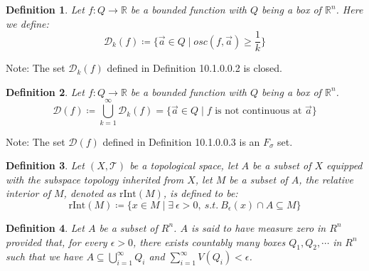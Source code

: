 \documentclass[15pt]{book}
\theoremstyle{break}
\theoremstyle{break}
\newtheorem{defn}{Definition}[corL]
\newcommand{\R}{\mathbb{R}}
\newcommand{\D}{\mathcal{D}}
\newcommand{\T}{\mathcal{T}}
\newcommand{\note}{\color{red}Note: \color{black}}
\begin{document}
\hfill\break
\begin{defn}
Let $f:Q \to \R$ be a bounded function with $Q$ being a box of $\R^n$. Here we define:
$$\D_k(f)\coloneqq \{ \vec{a} \in Q \mid osc(f,\vec{a}) \geq \frac{1}{k}\}$$
\end{defn}
 
\note The set $\D_k(f)$ defined in Definition 10.1.0.0.2 is closed.

\begin{defn}
Let $f:Q \to \R$ be a bounded function with $Q$ being a box of $\R^n$. $$\D(f) \coloneqq \bigcup_{k=1}^\infty \D_k(f) = \{\vec{a}\in Q \mid f \text{ is not continuous at } \vec{a}\}$$
\end{defn}
\note The set $\D(f)$ defined in Definition 10.1.0.0.3 is an $F_\sigma$ set.

\begin{defn}
Let $(X,\T)$ be a topological space, let $A$ be a subset of $X$ equipped with the subspace topology inherited from $X$, let $M$ be a subset of $A$, the relative interior of $M$, denoted as $\text{rInt}(M)$, is defined to be: $$\text{rInt}(M) \coloneqq \{x\in M \mid \exists\ \epsilon >0,\ s.t.\  B_\epsilon(x)\cap A \subseteq M \}$$
\end{defn}

\begin{defn}
Let $A$ be a subset of $R^n$. $A$ is said to have measure zero in 
$R^n$ provided that, for every $\epsilon > 0$, there exists countably many boxes $Q_1,Q_2,\cdots$ in $R^n$ such that we have $A \subseteq \bigcup_{i=1}^\infty Q_i$ and $\sum_{i=1}^\infty V(Q_i)< \epsilon$. 
\end{defn}
\end{document}
